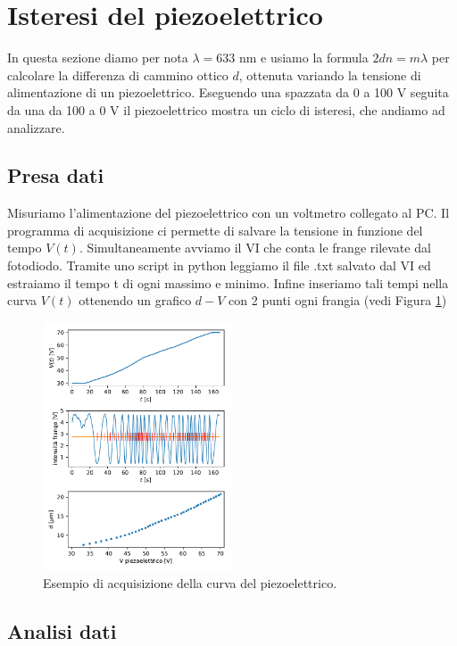 \documentclass[a4paper]{article}
\begin{document}
\section{Isteresi del piezoelettrico}

In questa sezione diamo per nota $\lambda = 633$ nm e usiamo la formula $2dn = m\lambda$ per calcolare la differenza di cammino ottico $d$, ottenuta variando la tensione di alimentazione di un piezoelettrico. Eseguendo una spazzata da 0 a 100 V seguita da una da 100 a 0 V il piezoelettrico mostra un ciclo di isteresi, che andiamo ad analizzare.

\subsection{Presa dati}
Misuriamo l'alimentazione del piezoelettrico con un voltmetro collegato al PC. Il programma di acquisizione ci permette di salvare la tensione in funzione del tempo $V(t)$.
Simultaneamente avviamo il VI che conta le frange rilevate dal fotodiodo. Tramite uno script in python leggiamo il file .txt salvato dal VI ed estraiamo il tempo t di ogni massimo e minimo. Infine inseriamo tali tempi nella curva $V(t)$ ottenendo un grafico $d-V$ con 2 punti ogni frangia (vedi Figura \ref{fig:esempio_acquisizione_isteresi})

\begin{figure}[H]
	\includegraphics[width=0.5\textwidth]{esempio_acquisizione_isteresi.pdf}
	\caption{Esempio di acquisizione della curva del piezoelettrico.}
	\label{fig:esempio_acquisizione_isteresi}
\end{figure}

\subsection{Analisi dati}
\end{document}
